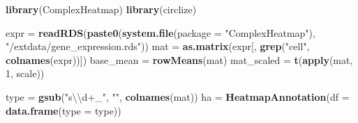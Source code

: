 \documentclass[]{book}
\newenvironment{Shaded}{\begin{snugshade}}{\end{snugshade}}
\newcommand{\KeywordTok}[1]{\textcolor[rgb]{0.13,0.29,0.53}{\textbf{#1}}}
\newcommand{\DataTypeTok}[1]{\textcolor[rgb]{0.13,0.29,0.53}{#1}}
\newcommand{\DecValTok}[1]{\textcolor[rgb]{0.00,0.00,0.81}{#1}}
\newcommand{\CharTok}[1]{\textcolor[rgb]{0.31,0.60,0.02}{#1}}
\newcommand{\StringTok}[1]{\textcolor[rgb]{0.31,0.60,0.02}{#1}}
\newcommand{\NormalTok}[1]{#1}
\theoremstyle{definition}
\theoremstyle{definition}
\theoremstyle{definition}
\theoremstyle{remark}
\begin{document}
\begin{Shaded}
\begin{Highlighting}[]
\KeywordTok{library}\NormalTok{(ComplexHeatmap)}
\KeywordTok{library}\NormalTok{(circlize)}

\NormalTok{expr =}\StringTok{ }\KeywordTok{readRDS}\NormalTok{(}\KeywordTok{paste0}\NormalTok{(}\KeywordTok{system.file}\NormalTok{(}\DataTypeTok{package =} \StringTok{"ComplexHeatmap"}\NormalTok{), }\StringTok{"/extdata/gene_expression.rds"}\NormalTok{))}
\NormalTok{mat =}\StringTok{ }\KeywordTok{as.matrix}\NormalTok{(expr[, }\KeywordTok{grep}\NormalTok{(}\StringTok{"cell"}\NormalTok{, }\KeywordTok{colnames}\NormalTok{(expr))])}
\NormalTok{base_mean =}\StringTok{ }\KeywordTok{rowMeans}\NormalTok{(mat)}
\NormalTok{mat_scaled =}\StringTok{ }\KeywordTok{t}\NormalTok{(}\KeywordTok{apply}\NormalTok{(mat, }\DecValTok{1}\NormalTok{, scale))}

\NormalTok{type =}\StringTok{ }\KeywordTok{gsub}\NormalTok{(}\StringTok{"s}\CharTok{\textbackslash{}\textbackslash{}}\StringTok{d+_"}\NormalTok{, }\StringTok{""}\NormalTok{, }\KeywordTok{colnames}\NormalTok{(mat))}
\NormalTok{ha =}\StringTok{ }\KeywordTok{HeatmapAnnotation}\NormalTok{(}\DataTypeTok{df =} \KeywordTok{data.frame}\NormalTok{(}\DataTypeTok{type =}\NormalTok{ type))}


\end{Highlighting}
\end{Shaded}
\end{document}
